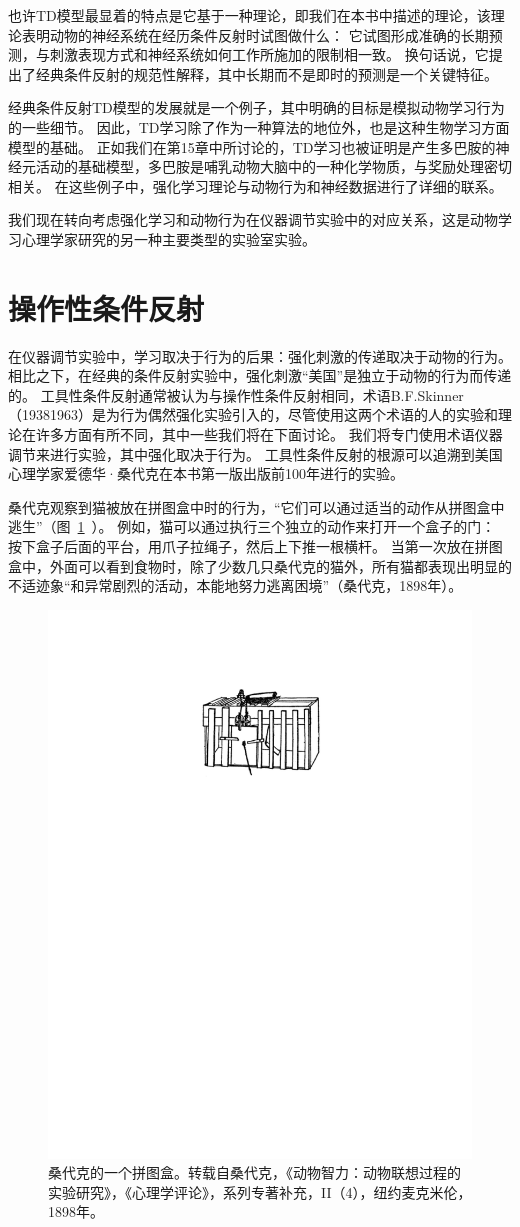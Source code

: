 {也许TD模型最显着的特点是它基于一种理论，即我们在本书中描述的理论，该理论表明动物的神经系统在经历条件反射时试图做什么：
它试图形成准确的长期预测，与刺激表现方式和神经系统如何工作所施加的限制相一致。
换句话说，它提出了经典条件反射的规范性解释，其中长期而不是即时的预测是一个关键特征。


经典条件反射TD模型的发展就是一个例子，其中明确的目标是模拟动物学习行为的一些细节。
因此，TD学习除了作为一种算法的地位外，也是这种生物学习方面模型的基础。
正如我们在第15章中所讨论的，TD学习也被证明是产生多巴胺的神经元活动的基础模型，多巴胺是哺乳动物大脑中的一种化学物质，与奖励处理密切相关。
在这些例子中，强化学习理论与动物行为和神经数据进行了详细的联系。


我们现在转向考虑强化学习和动物行为在仪器调节实验中的对应关系，这是动物学习心理学家研究的另一种主要类型的实验室实验。


\section{操作性条件反射} \label{sec:instrumental_conditioning}

在仪器调节实验中，学习取决于行为的后果：强化刺激的传递取决于动物的行为。
相比之下，在经典的条件反射实验中，强化刺激“美国”是独立于动物的行为而传递的。
工具性条件反射通常被认为与操作性条件反射相同，术语B.F.Skinner（19381963）是为行为偶然强化实验引入的，尽管使用这两个术语的人的实验和理论在许多方面有所不同，其中一些我们将在下面讨论。
我们将专门使用术语仪器调节来进行实验，其中强化取决于行为。
工具性条件反射的根源可以追溯到美国心理学家爱德华·桑代克在本书第一版出版前100年进行的实验。


桑代克观察到猫被放在拼图盒中时的行为，“它们可以通过适当的动作从拼图盒中逃生”（图~\ref{fig:11_7}~）。
例如，猫可以通过执行三个独立的动作来打开一个盒子的门：
按下盒子后面的平台，用爪子拉绳子，然后上下推一根横杆。
当第一次放在拼图盒中，外面可以看到食物时，除了少数几只桑代克的猫外，所有猫都表现出明显的不适迹象“和异常剧烈的活动，本能地努力逃离困境”（桑代克，1898年）。


\begin{figure}[!htb]
	\centering
	\includegraphics[width=0.5\linewidth]{chap11/fig_11_7}
	\caption{桑代克的一个拼图盒。转载自桑代克，《动物智力：动物联想过程的实验研究》，《心理学评论》，系列专著补充，II（4），纽约麦克米伦，1898年。  \label{fig:11_7}}
\end{figure}

}

